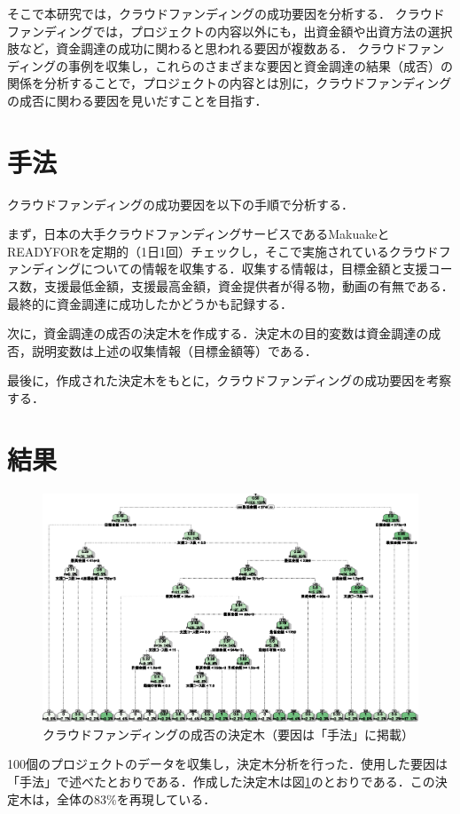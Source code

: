 \documentclass[uplatex,twocolumn]{jsarticle}
\begin{document}
そこで本研究では，クラウドファンディングの成功要因を分析する．
クラウドファンディングでは，プロジェクトの内容以外にも，出資金額や出資方法の選択肢など，資金調達の成功に関わると思われる要因が複数ある．
クラウドファンディングの事例を収集し，これらのさまざまな要因と資金調達の結果（成否）の関係を分析することで，プロジェクトの内容とは別に，クラウドファンディングの成否に関わる要因を見いだすことを目指す．

\section{手法}
クラウドファンディングの成功要因を以下の手順で分析する．

まず，日本の大手クラウドファンディングサービスであるMakuakeとREADYFORを定期的（1日1回）チェックし，そこで実施されているクラウドファンディングについての情報を収集する．収集する情報は，目標金額と支援コース数，支援最低金額，支援最高金額，資金提供者が得る物，動画の有無である．最終的に資金調達に成功したかどうかも記録する．

次に，資金調達の成否の決定木を作成する．決定木の目的変数は資金調達の成否，説明変数は上述の収集情報（目標金額等）である．

最後に，作成された決定木をもとに，クラウドファンディングの成功要因を考察する．

\section{結果}

\begin{figure}
\centering
\includegraphics[width=.78\textwidth]{figure.eps}
\caption{クラウドファンディングの成否の決定木（要因は「手法」に掲載）}\label{決定木}
\end{figure}

100個のプロジェクトのデータを収集し，決定木分析を行った．使用した要因は「手法」で述べたとおりである．作成した決定木は図\ref{決定木}のとおりである．この決定木は，全体の83\%を再現している．
\end{document}
